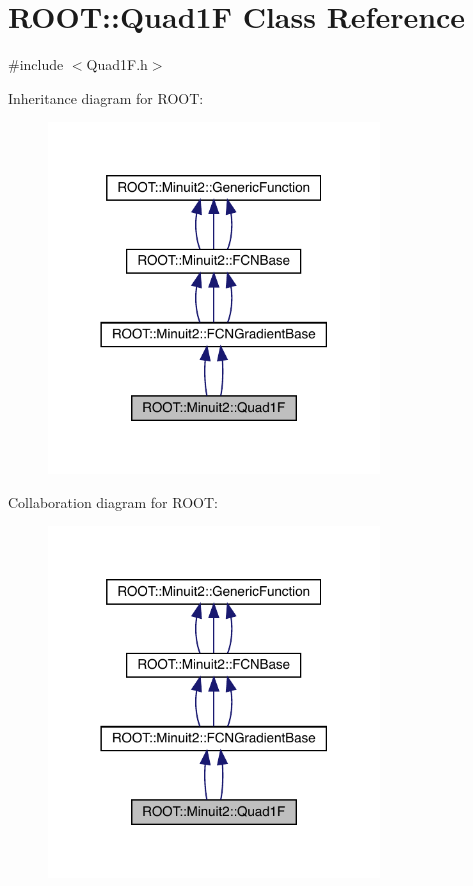 \hypertarget{classROOT_1_1Minuit2_1_1Quad1F}{}\section{R\+O\+OT\+:\+:Quad1F Class Reference}
\label{classROOT_1_1Minuit2_1_1Quad1F}


{\ttfamily \#include $<$Quad1\+F.\+h$>$}



Inheritance diagram for R\+O\+OT\+:
\nopagebreak
\begin{figure}[H]
\begin{center}
\leavevmode
\includegraphics[width=249pt]{dd/de0/classROOT_1_1Minuit2_1_1Quad1F__inherit__graph}
\end{center}
\end{figure}


Collaboration diagram for R\+O\+OT\+:
\nopagebreak
\begin{figure}[H]
\begin{center}
\leavevmode
\includegraphics[width=249pt]{de/d9b/classROOT_1_1Minuit2_1_1Quad1F__coll__graph}
\end{center}
\end{figure}
